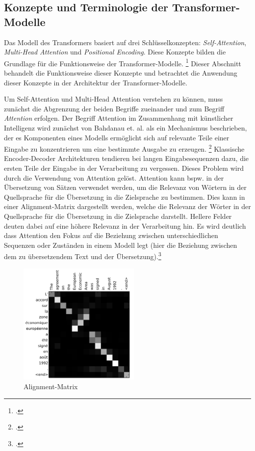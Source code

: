 \subsection{Konzepte und Terminologie der Transformer-Modelle}
Das Modell des Transformers basiert auf drei Schlüsselkonzepten: \emph{Self-Attention}, \emph{Multi-Head Attention} und \emph{Positional Encoding}. Diese Konzepte bilden die Grundlage für die Funktionsweise der Transformer-Modelle. \footcites[Vgl.][S. 1]{vaswani_attention_2017} Dieser Abschnitt behandelt die Funktionsweise dieser Konzepte und betrachtet die Anwendung dieser Konzepte in der Architektur der Transformer-Modelle.

Um Self-Attention und Multi-Head Attention verstehen zu können, muss zunächst die Abgrenzung der beiden Begriffe zueinander und zum Begriff \emph{Attention} erfolgen. Der Begriff Attention im Zusammenhang mit künstlicher Intelligenz wird zunächst von Bahdanau et. al. als ein Mechanismus beschrieben, der es Komponenten eines Modells ermöglicht sich auf relevante Teile einer Eingabe zu konzentrieren um eine bestimmte Ausgabe zu erzeugen. \footcites[Vgl.][S. 2 ff.]{bahdanau_neural_2014} Klassische Encoder-Decoder Architekturen tendieren bei langen Eingabesequenzen dazu, die ersten Teile der Eingabe in der Verarbeitung zu vergessen. Dieses Problem wird durch die Verwendung von Attention gelöst. Attention kann bspw. in der Übersetzung von Sätzen verwendet werden, um die Relevanz von Wörtern in der Quellsprache für die Übersetzung in die Zielsprache zu bestimmen. Dies kann in einer Alignment-Matrix dargestellt werden, welche die Relevanz der Wörter in der Quellsprache für die Übersetzung in die Zielsprache darstellt. Hellere Felder deuten dabei auf eine höhere Relevanz in der Verarbeitung hin. Es wird deutlich dass Attention den Fokus auf die Beziehung zwischen unterschiedlichen Sequenzen oder Zuständen in einem Modell legt (hier die Beziehung zwischen dem zu übersetzendem Text und der Übersetzung).\footcites[Vgl.][S. 5 ff.]{bahdanau_neural_2014}
\begin{figure}[h]
    \centering
    \includegraphics[height=60mm]{graphics/alignment_matrix.png}
    \caption[Alignment-Matrix]{Alignment-Matrix \footnotemark}
    \label{fig:attention}
\end{figure}

